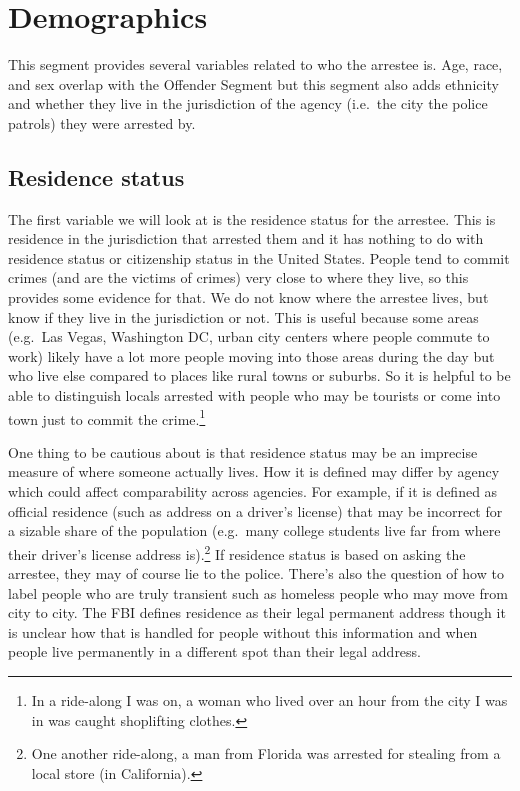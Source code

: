 \documentclass[
]{krantz}
\begin{document}
\section{Demographics}\label{demographics-3}

This segment provides several variables related to who the
arrestee is. Age, race, and sex overlap with the Offender
Segment but this segment also adds ethnicity and whether
they live in the jurisdiction of the agency (i.e.~the city
the police patrols) they were arrested by.

\subsection{Residence status}\label{residence-status-1}

The first variable we will look at is the residence status
for the arrestee. This is residence in the jurisdiction that
arrested them and it has nothing to do with residence status
or citizenship status in the United States. People tend to
commit crimes (and are the victims of crimes) very close to
where they live, so this provides some evidence for that. We
do not know where the arrestee lives, but know if they live
in the jurisdiction or not. This is useful because some
areas (e.g.~Las Vegas, Washington DC, urban city centers
where people commute to work) likely have a lot more people
moving into those areas during the day but who live else
compared to places like rural towns or suburbs. So it is
helpful to be able to distinguish locals arrested with
people who may be tourists or come into town just to commit
the crime.\footnote{In a ride-along I was on, a woman who
  lived over an hour from the city I was in was caught
  shoplifting clothes.}

One thing to be cautious about is that residence status may
be an imprecise measure of where someone actually lives. How
it is defined may differ by agency which could affect
comparability across agencies. For example, if it is defined
as official residence (such as address on a driver's
license) that may be incorrect for a sizable share of the
population (e.g.~many college students live far from where
their driver's license address is).\footnote{One another
  ride-along, a man from Florida was arrested for stealing
  from a local store (in California).} If residence status
is based on asking the arrestee, they may of course lie to
the police. There's also the question of how to label people
who are truly transient such as homeless people who may move
from city to city. The FBI defines residence as their legal
permanent address though it is unclear how that is handled
for people without this information and when people live
permanently in a different spot than their legal address.
\end{document}
